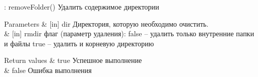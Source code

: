 \+: remove\+Folder() Удалить содержимое директории
\begin{DoxyParams}{Parameters}
{\em } & \mbox{[}in\mbox{]} dir Директория, которую необходимо очистить. \\
\hline
{\em } & \mbox{[}in\mbox{]} rmdir флаг (параметр удаления)\+: false – удалить только внутренние папки и файлы true – удалить и корневую директорию \\
\hline
\end{DoxyParams}

\begin{DoxyRetVals}{Return values}
{\em } & true Успешное выполнение \\
\hline
{\em } & false Ошибка выполнения \\
\hline
\end{DoxyRetVals}
